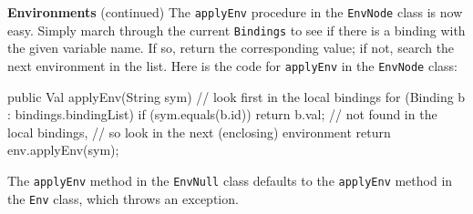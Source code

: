 \begin{minipage}[t]{\sw}
\slidenumber
\LARGE
{\bf Environments} (continued)\exx
The \verb'applyEnv' procedure in the \verb'EnvNode' class is now easy.
Simply march through the current \verb'Bindings'
to see if there is a binding with the given variable name.
If so, return the corresponding value;
if not, search the next environment in the list.\exx
Here is the code for \verb'applyEnv' in the \verb'EnvNode' class:
\begin{qv}
public Val applyEnv(String sym) {
    // look first in the local bindings
    for (Binding b : bindings.bindingList) {
        if (sym.equals(b.id))
            return b.val;
    }
    // not found in the local bindings,
    // so look in the next (enclosing) environment
    return env.applyEnv(sym);
}
\end{qv}
The \verb'applyEnv' method in the \verb'EnvNull' class
defaults to the \verb'applyEnv' method in the \verb'Env' class,
which throws an exception.
\end{minipage}
